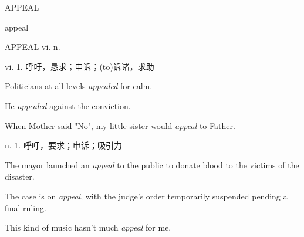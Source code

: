 \begin{flashcard}{
APPEAL

appeal
}
\begin{center}
APPEAL vi. n. 
\end{center}
\normalsize vi. 1. 呼吁，恳求；申诉；(to)诉诸，求助

\footnotesize Politicians at all levels \textit{appealed} for calm.

\footnotesize He \textit{appealed} against the conviction.

\footnotesize When Mother said "No", my little sister would \textit{appeal} to Father.

\normalsize n. 1. 呼吁，要求；申诉；吸引力

\footnotesize The mayor launched an \textit{appeal} to the public to donate blood to the victims of the disaster.

\footnotesize The case is on \textit{appeal}, with the judge's order temporarily suspended pending a final ruling.

\footnotesize This kind of music hasn't much \textit{appeal} for me.

\end{flashcard}
